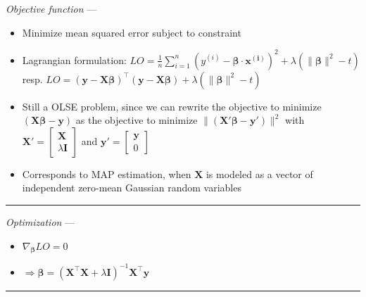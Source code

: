 \emph{Objective function} --- 
\begin{itemize}
    \item Minimize mean squared error subject to constraint
    \item Lagrangian formulation: $LO = \frac{1}{n} \sum_{i=1}^n ( y^{(i)} - \boldsymbol{\beta} \cdot \boldsymbol{x^{(i)}} )^2 + \lambda ( \|\boldsymbol{\beta}\|^2 - t )$ resp. $LO = ( \boldsymbol{y} - \boldsymbol{X}\boldsymbol{\beta})^\intercal( \boldsymbol{y} - \boldsymbol{X}\boldsymbol{\beta} ) + \lambda ( \|\boldsymbol{\beta}\|^2 - t )$
    \item Still a OLSE problem, since we can rewrite the objective to minimize $(\boldsymbol{X}\boldsymbol{\beta} - \boldsymbol{y})$ as the objective to minimize $\|(\boldsymbol{X}'\boldsymbol{\beta} - \boldsymbol{y}')\|^2$ with $\boldsymbol{X}' = 
    \begin{bmatrix} 
    \boldsymbol{X} \\
    \lambda \boldsymbol{I}
    \end{bmatrix}$ 
    and $\boldsymbol{y}' = 
    \begin{bmatrix} 
    \boldsymbol{y} \\
    0
    \end{bmatrix}$
    \item Corresponds to MAP estimation, when $\boldsymbol{X}$ is modeled as a vector of independent zero-mean Gaussian random variables
\end{itemize}

{\color{lightgray}\hrule height 0.001mm}

\emph{Optimization} ---
\begin{itemize}
    \item $\nabla_{\boldsymbol{\beta}} LO = 0$
    \item $\Rightarrow \boldsymbol{\beta} = (\boldsymbol{X}^\intercal \boldsymbol{X} + \lambda \boldsymbol{I})^{-1}  \boldsymbol{X}^\intercal \boldsymbol{y}$
\end{itemize}

{\color{lightgray}\hrule height 0.001mm}

